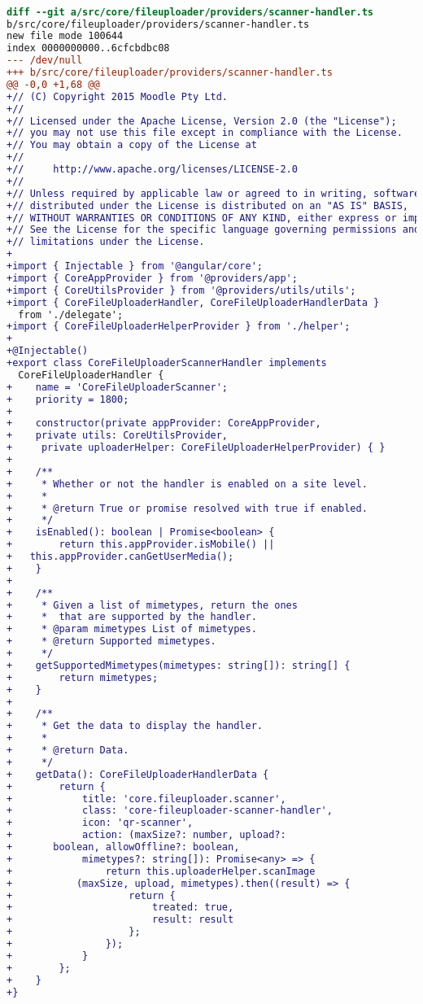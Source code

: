 \begin{lstlisting}[language=diff, frame=single, label ={scanner-handler}, caption = File \texttt{scanner-handler.ts} ]

diff --git a/src/core/fileuploader/providers/scanner-handler.ts 
b/src/core/fileuploader/providers/scanner-handler.ts
new file mode 100644
index 0000000000..6cfcbdbc08
--- /dev/null
+++ b/src/core/fileuploader/providers/scanner-handler.ts
@@ -0,0 +1,68 @@
+// (C) Copyright 2015 Moodle Pty Ltd.
+//
+// Licensed under the Apache License, Version 2.0 (the "License");
+// you may not use this file except in compliance with the License.
+// You may obtain a copy of the License at
+//
+//     http://www.apache.org/licenses/LICENSE-2.0
+//
+// Unless required by applicable law or agreed to in writing, software
+// distributed under the License is distributed on an "AS IS" BASIS,
+// WITHOUT WARRANTIES OR CONDITIONS OF ANY KIND, either express or implied.
+// See the License for the specific language governing permissions and
+// limitations under the License.
+
+import { Injectable } from '@angular/core';
+import { CoreAppProvider } from '@providers/app';
+import { CoreUtilsProvider } from '@providers/utils/utils';
+import { CoreFileUploaderHandler, CoreFileUploaderHandlerData } 
  from './delegate';
+import { CoreFileUploaderHelperProvider } from './helper';
+
+@Injectable()
+export class CoreFileUploaderScannerHandler implements 
  CoreFileUploaderHandler {
+    name = 'CoreFileUploaderScanner';
+    priority = 1800;
+
+    constructor(private appProvider: CoreAppProvider, 
+    private utils: CoreUtilsProvider,
+     private uploaderHelper: CoreFileUploaderHelperProvider) { }
+
+    /**
+     * Whether or not the handler is enabled on a site level.
+     *
+     * @return True or promise resolved with true if enabled.
+     */
+    isEnabled(): boolean | Promise<boolean> {
+        return this.appProvider.isMobile() || 
+	this.appProvider.canGetUserMedia();
+    }
+
+    /**
+     * Given a list of mimetypes, return the ones
+     *  that are supported by the handler.
+     * @param mimetypes List of mimetypes.
+     * @return Supported mimetypes.
+     */
+    getSupportedMimetypes(mimetypes: string[]): string[] {
+        return mimetypes;
+    }
+
+    /**
+     * Get the data to display the handler.
+     *
+     * @return Data.
+     */
+    getData(): CoreFileUploaderHandlerData {
+        return {
+            title: 'core.fileuploader.scanner',
+            class: 'core-fileuploader-scanner-handler',
+            icon: 'qr-scanner',
+            action: (maxSize?: number, upload?: 
+	    boolean, allowOffline?: boolean, 
+            mimetypes?: string[]): Promise<any> => {
+                return this.uploaderHelper.scanImage
+	        (maxSize, upload, mimetypes).then((result) => {
+                    return {
+                        treated: true,
+                        result: result
+                    };
+                });
+            }
+        };
+    }
+}
\end{lstlisting} 

